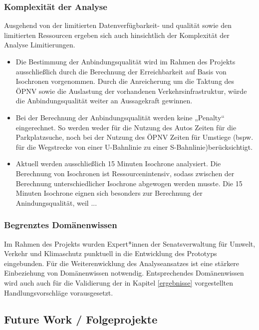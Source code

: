 \subsubsection{Komplexität der Analyse}
Ausgehend von der limitierten Datenverfügbarkeit- und qualität sowie den limitierten Ressourcen ergeben sich auch hinsichtlich der Komplexität der Analyse Limitierungen. 

\begin{itemize}

    \item Die Bestimmung der Anbindungsqualität wird im Rahmen des Projekts ausschließlich durch die Berechnung der Erreichbarkeit auf Basis von Isochronen vorgenommen. Durch die Anreicherung um die Taktung des ÖPNV sowie die Auslastung der vorhandenen Verkehrsinfrastruktur, würde die Anbindungsqualität weiter an Aussagekraft gewinnen. 
    
    \item Bei der Berechnung der Anbindungsqualität werden keine „Penalty“ eingerechnet. So werden weder für die Nutzung des Autos Zeiten für die Parkplatzsuche, noch bei der Nutzung des ÖPNV Zeiten für Umstiege (bspw. für die Wegstrecke von einer U-Bahnlinie zu einer S-Bahnlinie)berücksichtigt. 
    \item Aktuell werden ausschließlich 15 Minuten Isochrone analysiert​. Die Berechnung von Isochronen ist Ressourcenintensiv, sodass zwischen der Berechnung unterschiedlicher Isochrone abgewogen werden musste. Die 15 Minuten Isochrone eignen sich besonders zur Berechnung der Anindungsqualität, weil ...
\end{itemize}


\subsubsection{Begrenztes Domänenwissen}
Im Rahmen des Projekts wurden Expert*innen der Senatsverwaltung für Umwelt, Verkehr und Klimaschutz punktuell in die Entwicklung des Prototyps eingebunden. Für die Weiterenwicklung des Analyseansatzes ist eine stärkere Einbeziehung von Domänenwissen notwendig. Entsprechendes Domänenwissen wird auch auch für die Validierung der in Kapitel \ref{ergebnisse} vorgestellten Handlungsvorschläge vorausgesetzt.


\subsection{Future Work / Folgeprojekte}

